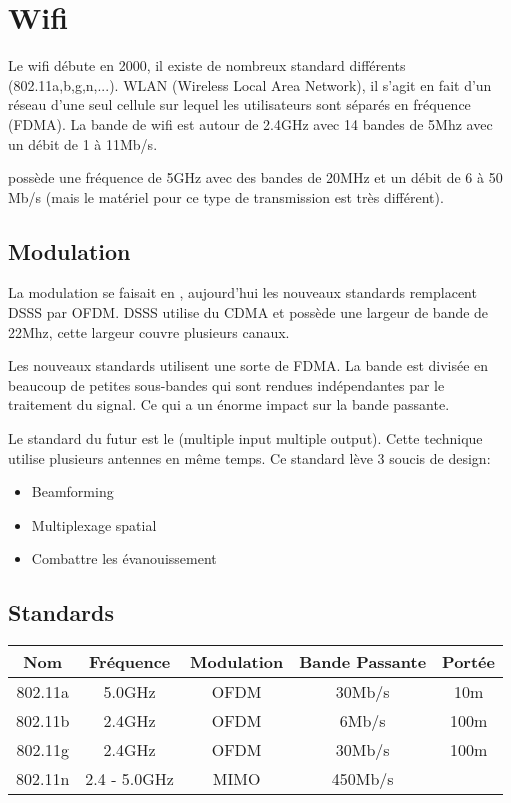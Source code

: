 \chapter{Wifi}

Le wifi débute en 2000, il existe de nombreux standard différents (802.11a,b,g,n,...). WLAN (Wireless Local Area Network), il s'agit en fait d'un réseau d'une seul cellule sur lequel les utilisateurs sont séparés en fréquence (FDMA). La bande de wifi est autour de 2.4GHz avec 14 bandes de 5Mhz avec un débit de 1 à 11Mb/s.

 possède une fréquence de 5GHz avec des bandes de 20MHz et un débit de 6 à 50 Mb/s (mais le matériel pour ce type de transmission est très différent).

\section{Modulation}

La modulation se faisait en , aujourd'hui les nouveaux standards remplacent DSSS par OFDM. DSSS utilise du CDMA et possède une largeur de bande de 22Mhz, cette largeur couvre plusieurs canaux.

Les nouveaux standards  utilisent une sorte de FDMA. La bande est divisée en beaucoup de petites sous-bandes qui sont rendues indépendantes par le traitement du signal. Ce qui a un énorme impact sur la bande passante.

Le standard du futur est le  (multiple input multiple output). Cette technique utilise plusieurs antennes en même temps. Ce standard lève 3 soucis de design:
\begin{itemize}
\item Beamforming
\item Multiplexage spatial
\item Combattre les évanouissement
\end{itemize}

\section{Standards}
\begin{center}
\begin{tabular}{ccccc}
Nom & Fréquence & Modulation & Bande Passante & Portée\\
\hline
802.11a & 5.0GHz & OFDM & 30Mb/s & 10m\\
802.11b & 2.4GHz & OFDM & 6Mb/s & 100m\\
802.11g & 2.4GHz & OFDM & 30Mb/s & 100m\\
802.11n & 2.4 - 5.0GHz& MIMO & 450Mb/s & \\
\hline
\end{tabular}
\end{center}

